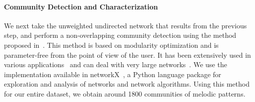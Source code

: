 {\paragraph{Community Detection and Characterization}
\label{sec:patterns_characterization_community_detection}

We next take the unweighted undirected network that results from the previous step, and perform a non-overlapping community detection using the method proposed in~\cite{blondel2008fast}. This method is based on modularity optimization and is parameter-free from the point of view of the user. It has been extensively used in various applications~\citep{fortunato2010community} and can deal with very large networks~\citep{blondel2008fast}. We use the implementation available in networkX~\citep{hagberg-2008-exploring}, a Python language package for exploration and analysis of networks and network algorithms. Using this method for our entire dataset, we obtain around 1800 communities of melodic patterns. 


}
